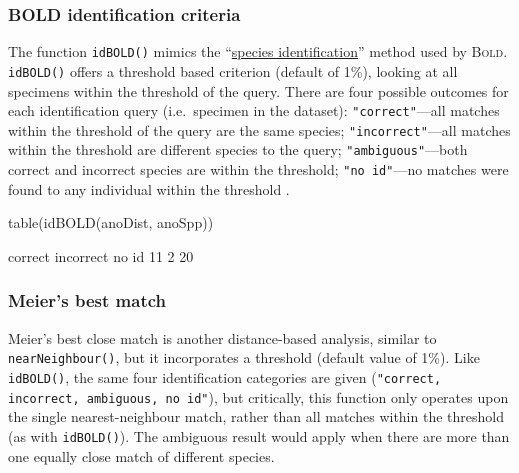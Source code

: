 \documentclass{article}
\newcommand{\progname}[1]{\textsc{#1}}
\newcommand{\fun}[1]{\texttt{#1}}
\begin{document}
\subsubsection{BOLD identification criteria}%
The function \fun{idBOLD()} mimics the ``\href{http://www.barcodinglife.com/views/idrequest.php}{species identification}'' method used by \progname{Bold}. \fun{idBOLD()} offers a threshold based criterion (default of 1\%), looking at all specimens within the threshold of the query. There are four possible outcomes for each identification query (i.e.\ specimen in the dataset): \fun{"correct"}---all matches within the threshold of the query are the same species; \fun{"incorrect"}---all matches within the threshold are different species to the query; \fun{"ambiguous"}---both correct and incorrect species are within the threshold; \fun{"no id"}---no matches were found to any individual within the threshold . 

\begin{console}
table(idBOLD(anoDist, anoSpp))
\end{console}

\begin{Routput}
  correct incorrect     no id 
       11         2        20 
\end{Routput}

\subsubsection{Meier's best match}
Meier's best close match \citep{Meier.2006} is another distance-based analysis, similar to \fun{nearNeighbour()}, but it incorporates a threshold (default value of 1\%). Like \fun{idBOLD()}, the same four identification categories are given (\fun{"correct, incorrect, ambiguous, no id"}), but critically, this function only operates upon the single nearest-neighbour match, rather than all matches within the threshold (as with \fun{idBOLD()}). The ambiguous result would apply when there are more than one equally close match of different species. 

\end{document}
